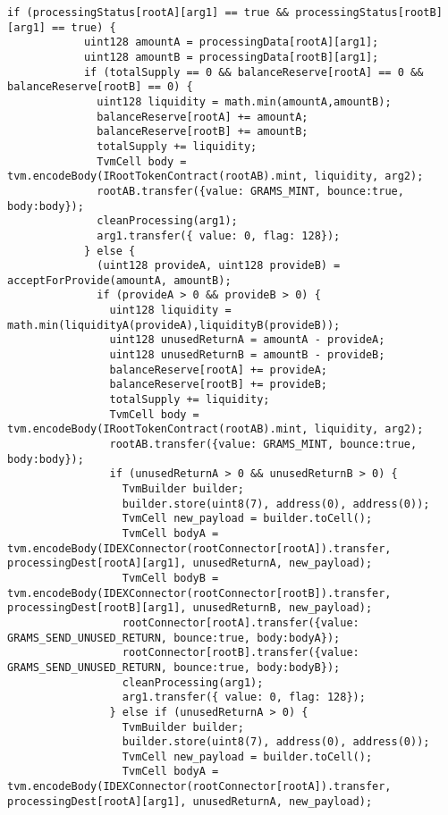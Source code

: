 \begin{lstlisting}[firstnumber=248]
          if (processingStatus[rootA][arg1] == true && processingStatus[rootB][arg1] == true) {
            uint128 amountA = processingData[rootA][arg1];
            uint128 amountB = processingData[rootB][arg1];
            if (totalSupply == 0 && balanceReserve[rootA] == 0 && balanceReserve[rootB] == 0) {
              uint128 liquidity = math.min(amountA,amountB);
              balanceReserve[rootA] += amountA;
              balanceReserve[rootB] += amountB;
              totalSupply += liquidity;
              TvmCell body = tvm.encodeBody(IRootTokenContract(rootAB).mint, liquidity, arg2);
              rootAB.transfer({value: GRAMS_MINT, bounce:true, body:body});
              cleanProcessing(arg1);
              arg1.transfer({ value: 0, flag: 128});
            } else {
              (uint128 provideA, uint128 provideB) = acceptForProvide(amountA, amountB);
              if (provideA > 0 && provideB > 0) {
                uint128 liquidity = math.min(liquidityA(provideA),liquidityB(provideB));
                uint128 unusedReturnA = amountA - provideA;
                uint128 unusedReturnB = amountB - provideB;
                balanceReserve[rootA] += provideA;
                balanceReserve[rootB] += provideB;
                totalSupply += liquidity;
                TvmCell body = tvm.encodeBody(IRootTokenContract(rootAB).mint, liquidity, arg2);
                rootAB.transfer({value: GRAMS_MINT, bounce:true, body:body});
                if (unusedReturnA > 0 && unusedReturnB > 0) {
                  TvmBuilder builder;
                  builder.store(uint8(7), address(0), address(0));
                  TvmCell new_payload = builder.toCell();
                  TvmCell bodyA = tvm.encodeBody(IDEXConnector(rootConnector[rootA]).transfer, processingDest[rootA][arg1], unusedReturnA, new_payload);
                  TvmCell bodyB = tvm.encodeBody(IDEXConnector(rootConnector[rootB]).transfer, processingDest[rootB][arg1], unusedReturnB, new_payload);
                  rootConnector[rootA].transfer({value: GRAMS_SEND_UNUSED_RETURN, bounce:true, body:bodyA});
                  rootConnector[rootB].transfer({value: GRAMS_SEND_UNUSED_RETURN, bounce:true, body:bodyB});
                  cleanProcessing(arg1);
                  arg1.transfer({ value: 0, flag: 128});
                } else if (unusedReturnA > 0) {
                  TvmBuilder builder;
                  builder.store(uint8(7), address(0), address(0));
                  TvmCell new_payload = builder.toCell();
                  TvmCell bodyA = tvm.encodeBody(IDEXConnector(rootConnector[rootA]).transfer, processingDest[rootA][arg1], unusedReturnA, new_payload);

\end{lstlisting}
